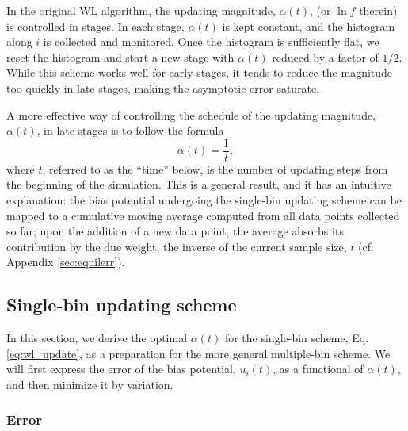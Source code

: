 \documentclass[reprint, superscriptaddress, floatfix]{revtex4-1}
\begin{document}
In the original WL algorithm\cite{
wang2001, wang2001pre},
the updating magnitude, $\alpha(t)$,
(or $\ln f$ therein)
is controlled in stages.
%
In each stage, $\alpha(t)$
is kept constant,
and the histogram along $i$
is collected and monitored.
%
Once the histogram is sufficiently flat,
we reset the histogram and start a new stage
with $\alpha(t)$ reduced by a factor of $1/2$\cite{
wang2001, wang2001pre}.
%
While this scheme works well for early stages,
it tends to reduce the magnitude
too quickly in late stages, making the asymptotic error
saturate\cite{
belardinelli2007, *belardinelli2007jcp, *belardinelli2008, *belardinelli2016}.


A more effective way
of controlling the schedule of the updating magnitude, $\alpha(t)$,
in late stages
is to follow the formula
%
\begin{equation}
  \alpha(t) = \frac{1}{t},
  \label{eq:alpha_invt}
\end{equation}
%
where $t$,
referred to as the ``time'' below,
is the number of updating steps
from the beginning of the simulation\cite{
belardinelli2007, *belardinelli2007jcp, *belardinelli2008, *belardinelli2016,
morozov2007, zhou2008,
komura2012, *caparica2012, *caparica2014}.
%
This is a general result\cite{
  robbins1951, pellegrini2014},
and it has an intuitive explanation:\cite{
  marsili2006, barducci2008}
the bias potential undergoing the single-bin updating scheme
can be mapped to a cumulative moving average computed from all data points collected so far;
upon the addition of a new data point,
the average absorbs its contribution by the due weight,
the inverse of the current sample size, $t$
(cf. Appendix \ref{sec:equilerr}).




\subsection{\label{sec:single-bin}
Single-bin updating scheme}



In this section,
we derive the optimal $\alpha(t)$
for the single-bin scheme,
Eq. \eqref{eq:wl_update},
as a preparation
for the more general multiple-bin scheme.
%
We will first express the error of
the bias potential, $u_i(t)$,
as a functional of $\alpha(t)$,
and then minimize it by variation.
%



\subsubsection{Error}
\end{document}
